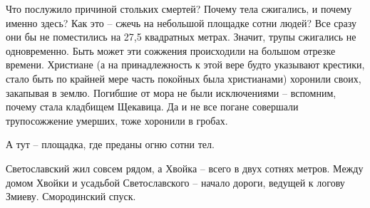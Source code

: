 Что послужило причиной стольких смертей? Почему тела сжигались, и почему именно здесь? Как это – сжечь на небольшой площадке сотни людей? Все сразу они бы не поместились на 27,5 квадратных метрах. Значит, трупы сжигались не одновременно. Быть может эти сожжения происходили на большом отрезке времени. Христиане (а на принадлежность к этой вере будто указывают крестики, стало быть по крайней мере часть покойных была христианами) хоронили своих, закапывая в землю. Погибшие от мора не были исключениями – вспомним, почему стала кладбищем Щекавица. Да и не все погане совершали трупосожжение умерших, тоже хоронили в гробах.

А тут – площадка, где преданы огню сотни тел.

Светославский жил совсем рядом, а Хвойка – всего в двух сотнях метров. Между домом Хвойки и усадьбой Светославского – начало дороги, ведущей к логову Змиеву. Смородинский спуск.
